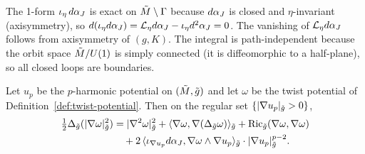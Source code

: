\begin{remark}
The 1-form $\iota_\eta \, d\alpha_J$ is exact on $\tilde{M} \setminus \Gamma$ because $d\alpha_J$ is closed and $\eta$-invariant (axisymmetry), so $d(\iota_\eta d\alpha_J) = \mathcal{L}_\eta d\alpha_J - \iota_\eta d^2\alpha_J = 0$. The vanishing of $\mathcal{L}_\eta d\alpha_J$ follows from axisymmetry of $(g, K)$. The integral is path-independent because the orbit space $\tilde{M}/U(1)$ is simply connected (it is diffeomorphic to a half-plane), so all closed loops are boundaries.
\end{remark}

\begin{lemma}\label{lem:twisted-bochner}
Let $u_p$ be the $p$-harmonic potential on $(\tilde{M}, \tilde{g})$ and let $\omega$ be the twist potential of Definition~\ref{def:twist-potential}. Then on the regular set $\{|\nabla u_p|_{\tilde{g}} > 0\}$,
\begin{equation}\label{eq:twisted-bochner}
\begin{aligned}
\tfrac{1}{2}\Delta_{\tilde{g}}(|\nabla \omega|_{\tilde{g}}^2)
&= |\nabla^2 \omega|_{\tilde{g}}^2 + \langle \nabla \omega, \nabla(\Delta_{\tilde{g}} \omega)\rangle_{\tilde{g}} + \mathrm{Ric}_{\tilde{g}}(\nabla \omega, \nabla \omega) \\
&\quad + 2\,\langle \iota_{\nabla u_p} d\alpha_J, \nabla \omega \wedge \nabla u_p \rangle_{\tilde{g}} \cdot |\nabla u_p|_{\tilde{g}}^{p-2}.
\end{aligned}
\end{equation}
\end{lemma}


